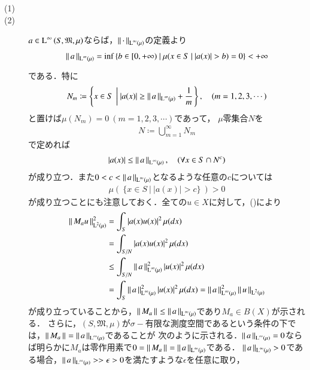 \begin{prf}
\begin{description}\mbox{}
	\item[(1)] 
	\item[(2)] $a \in \operatorname{L}^{\infty} \left(S, \mathfrak{M}, \mu\right)$ならば，$\left\|\, \cdot\, \right\|_{\operatorname{L}^{\infty} \left(\mu\right)}$の定義より
		\begin{align}
			\left\|\, a\, \right\|_{\operatorname{L}^{\infty} \left(\mu\right)} = \operatorname*{inf}_{} \left\{b \in [0, +\infty)\ |\ \mu(x \in S\ |\ |a(x)| > b) = 0 \right\} < +\infty
		\end{align}
		である．特に
		\begin{align}
			N_m \coloneqq \left\{x \in S\ \left|\ |a(x)| \geq \left\|\, a\, \right\|_{\operatorname{L}^{\infty} \left(\mu\right)} + \frac{1}{m} \right.\right\}, \quad(m = 1,2,3,\cdots)
		\end{align}
		と置けば$\mu(N_m)=0\ (m=1,2,3,\cdots)$であって，
		$\mu$零集合$N$を
		\begin{align}
			N \coloneqq \bigcup_{m=1}^{\infty} N_m
		\end{align}
		で定めれば
		\begin{align}
			|a(x)| \leq \left\|\, a\, \right\|_{\operatorname{L}^{\infty} \left(\mu\right)}, \quad (\forall x \in S \cap N^c) \label{eq:func_analy_Q9}
		\end{align}
		が成り立つ．また$0 < c < \left\|\, a\, \right\|_{\operatorname{L}^{\infty} \left(\mu\right)}$となるような任意の$c$については
		\begin{align}
			\mu(\ \{x \in S\ |\ |a(x)| > c\}\ ) > 0 \label{eq:func_analy_Linfty}
		\end{align}
		が成り立つことにも注意しておく．全ての$u \in X$に対して，()により
		\begin{align}
			\left\|\, M_a u\, \right\|_{\operatorname{L}^{2} \left(\mu\right)}^2 
			&= \int_{S} |a(x)u(x)|^2\, \mu(dx) \\
			&= \int_{S/N} |a(x)u(x)|^2\, \mu(dx) \\
			&\leq \int_{S/N} \left\|\, a\, \right\|_{\operatorname{L}^{\infty} \left(\mu\right)}^2|u(x)|^2\, \mu(dx) \\
			&= \int_{S} \left\|\, a\, \right\|_{\operatorname{L}^{\infty} \left(\mu\right)}^2|u(x)|^2\, \mu(dx)
			= \left\|\, a\, \right\|_{\operatorname{L}^{\infty} \left(\mu\right)}^2 \left\|\, u\, \right\|_{\operatorname{L}^{2} \left(\mu\right)}
		\end{align}
		が成り立っていることから，$\left\|\, M_a\, \right\|_{} \leq \left\|\, a\, \right\|_{\operatorname{L}^{\infty} \left(\mu\right)}$であり$M_a \in B(X)$が示される．
		さらに，$(S, \mathfrak{M}, \mu)$が$\sigma-$有限な測度空間であるという条件の下では，$\left\|\, M_a\, \right\|_{} = \left\|\, a\, \right\|_{\operatorname{L}^{\infty} \left(\mu\right)}$であることが
		次のように示される．$\left\|\, a\, \right\|_{\operatorname{L}^{\infty} \left(\mu\right)} = 0$ならば明らかに$M_a$は零作用素で$0 = \left\|\, M_a\, \right\|_{} = \left\|\, a\, \right\|_{\operatorname{L}^{\infty} \left(\mu\right)}$である．
		$\left\|\, a\, \right\|_{\operatorname{L}^{\infty} \left(\mu\right)} > 0$である場合，$\left\|\, a\, \right\|_{\operatorname{L}^{\infty} \left(\mu\right)} >> \epsilon > 0$を満たすような$\epsilon$を任意に取り，

\end{description}
\end{prf}

